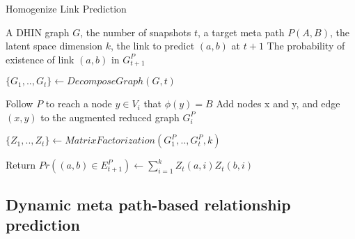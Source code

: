 \begin{algorithm}[t]
\caption{Homogenize Link Prediction}\label{alg1}
\begin{algorithmic}[1]\scriptsize
\REQUIRE A DHIN graph $G$, the number of snapshots $t$, a target meta path $P(A,B)$, the latent space dimension $k$, the link to predict $(a,b)$ at $t+1$
\ENSURE The probability of existence of link $(a,b)$ in $G^P_{t+1}$

\STATE $\{G_1, .., G_t\} \leftarrow DecomposeGraph(G, t)$

    
        \STATE Follow $P$ to reach a node $y\in V_i$ that $\phi(y)=B$%
        \STATE Add nodes x and y, and edge $(x,y)$ to the augmented reduced graph $G_i^P$ 
\ENDFOR

\ENDFOR
\STATE $\{Z_1, .., Z_t\} \leftarrow MatrixFactorization(G^P_1, .., G^P_t, k)$

\STATE Return $Pr((a,b)\in E^P_{t+1}) \leftarrow \sum_{i=1}^{k} Z_t(a,i)Z_t(b,i)$


\end{algorithmic}
\end{algorithm}



\subsection{Dynamic meta path-based relationship prediction}


